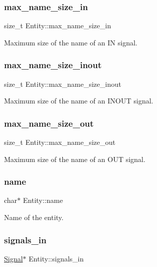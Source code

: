 \subsubsection{\texorpdfstring{max\_name\_size\_in}{max\_name\_size\_in}}
{\footnotesize\ttfamily size\+\_\+t Entity\+::max\+\_\+name\+\_\+size\+\_\+in}

Maximum size of the name of an IN signal. \mbox{\label{struct_entity_a33a2fca24ecaee57aaf1b2416463e1bd}} 
\subsubsection{\texorpdfstring{max\_name\_size\_inout}{max\_name\_size\_inout}}
{\footnotesize\ttfamily size\+\_\+t Entity\+::max\+\_\+name\+\_\+size\+\_\+inout}

Maximum size of the name of an I\+N\+O\+UT signal. \mbox{\label{struct_entity_ade510913e1937e285e677c2b281cb09e}} 
\subsubsection{\texorpdfstring{max\_name\_size\_out}{max\_name\_size\_out}}
{\footnotesize\ttfamily size\+\_\+t Entity\+::max\+\_\+name\+\_\+size\+\_\+out}

Maximum size of the name of an O\+UT signal. \mbox{\label{struct_entity_a861f653e2ffbe97c0deed7ab85eb7ce6}} 
\subsubsection{\texorpdfstring{name}{name}}
{\footnotesize\ttfamily char$\ast$ Entity\+::name}

Name of the entity. \mbox{\label{struct_entity_a52dafc8055e7c6c1b21520fad2d703b2}} 
\subsubsection{\texorpdfstring{signals\_in}{signals\_in}}
{\footnotesize\ttfamily \mbox{\hyperlink{struct_signal}{Signal}}$\ast$ Entity\+::signals\+\_\+in}

